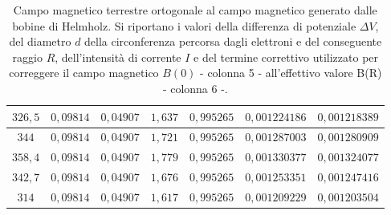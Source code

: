 \documentclass[]{article}
\begin{document}
\begin{table}[H]
\begin{tabular}{||c|c|c|c|c|c|c||}
        $326,5$ & $0,09814$ & $0,04907 $ & $1,637$ & $0,995265$ & $0,001224186$ & $0,001218389$ \\\hline
        $344  $ & $0,09814$ & $0,04907 $ & $1,721$ & $0,995265$ & $0,001287003$ & $0,001280909$ \\\hline
        $358,4$ & $0,09814$ & $0,04907 $ & $1,779$ & $0,995265$ & $0,001330377$ & $0,001324077$ \\\hline
        $342,7$ & $0,09814$ & $0,04907 $ & $1,676$ & $0,995265$ & $0,001253351$ & $0,001247416$ \\\hline
        $314  $ & $0,09814$ & $0,04907 $ & $1,617$ & $0,995265$ & $0,001209229$ & $0,001203504$ \\\hline
    
    \end{tabular}
    \caption{Campo magnetico terrestre ortogonale al campo magnetico generato dalle bobine di Helmholz. Si riportano i valori della differenza di potenziale $\Delta V$, del diametro $ d $ della circonferenza percorsa dagli elettroni e del conseguente raggio $ R $, dell'intensità di corrente $ I $ e del termine correttivo utilizzato per correggere il campo magnetico $B(0)$ - colonna 5 - all'effettivo valore B(R) - colonna 6 -.}
    \label{CM_ortogonale}
\end{table}
\end{document}
